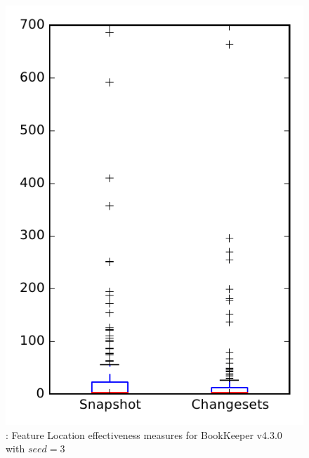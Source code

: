 
\begin{figure}
\centering
\includegraphics[height=0.4\textheight]{figures/flt_seed/rq1_bookkeeper_3}
\caption{\rone: Feature Location effectiveness measures for BookKeeper v4.3.0 with $seed=3$}
\label{fig:flt_seed:rq1:bookkeeper}
\end{figure}
